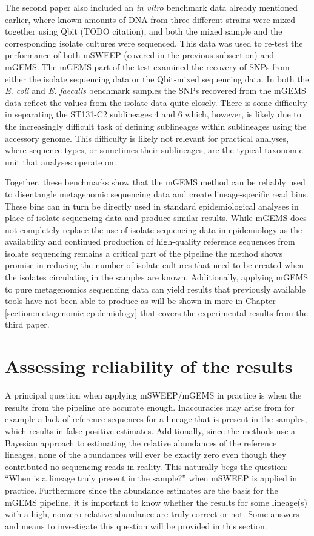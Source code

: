\documentclass[officiallayout]{tktla}
\begin{document}
The second paper also included an \textit{in vitro} benchmark data
already mentioned earlier, where known amounts of DNA from three
different strains were mixed together using Qbit (TODO citation), and
both the mixed sample and the corresponding isolate cultures were
sequenced. This data was used to re-test the performance of both
mSWEEP (covered in the previous subsection) and mGEMS. The mGEMS part
of the test examined the recovery of SNPs from either the isolate
sequencing data or the Qbit-mixed sequencing data. In both the
\textit{E. coli} and \textit{E. faecalis} benchmark samples the SNPs
recovered from the mGEMS data reflect the values from the isolate data
quite closely. There is some difficulty in separating the ST131-C2
sublineages 4 and 6 which, however, is likely due to the increasingly
difficult task of defining sublineages within sublineages using the
accessory genome. This difficulty is likely not relevant for practical
analyses, where sequence types, or sometimes their sublineages, are
the typical taxonomic unit that analyses operate on.

Together, these benchmarks show that the mGEMS method can be reliably
used to disentangle metagenomic sequencing data and create
lineage-specific read bins. These bins can in turn be directly used in
standard epidemiological analyses in place of isolate sequencing data
and produce similar results. While mGEMS does not completely replace
the use of isolate sequencing data in epidemiology \textemdash{ } as
the availability and continued production of high-quality reference
sequences from isolate sequencing remains a critical part of the
pipeline \textemdash{ } the method shows promise in reducing the
number of isolate cultures that need to be created when the isolates
circulating in the samples are known. Additionally, applying mGEMS to
pure metagenomics sequencing data can yield results that previously
available tools have not been able to produce as will be shown in more
in Chapter \ref{section:metagenomic-epidemiology} that covers the
experimental results from the third paper.

\section{Assessing reliability of the results}

A principal question when applying mSWEEP/mGEMS in practice is when
the results from the pipeline are accurate enough. Inaccuracies may
arise from for example a lack of reference sequences for a lineage
that is present in the samples, which results in false positive
estimates. Additionally, since the methods use a Bayesian approach to
estimating the relative abundances of the reference lineages, none of
the abundances will ever be exactly zero even though they contributed
no sequencing reads in reality. This naturally begs the question:
``When is a lineage truly present in the sample?'' when mSWEEP is
applied in practice. Furthermore since the abundance estimates are the
basis for the mGEMS pipeline, it is important to know whether the
results for some lineage(s) with a high, nonzero relative abundance
are truly correct or not. Some answers and means to investigate this
question will be provided in this section.
\end{document}
